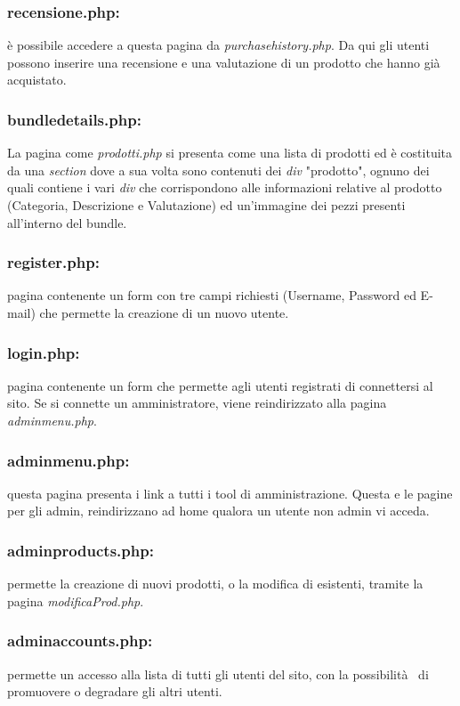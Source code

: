 \subsubsection{recensione.php:} \Spazio è possibile accedere a questa pagina da \textit{purchasehistory.php}. Da qui gli utenti possono inserire una recensione e una valutazione di un prodotto che hanno già acquistato.

\subsubsection{bundledetails.php:} \Spazio 
La pagina come \emph{prodotti.php} si presenta come una lista di prodotti ed è costituita da una \emph{section} dove a sua volta sono contenuti dei \emph{div} "prodotto", ognuno dei quali contiene i vari \emph{div} che corrispondono alle informazioni relative al prodotto (Categoria, Descrizione e Valutazione) ed un'immagine dei pezzi presenti all'interno del bundle.

\subsubsection{register.php:} \Spazio pagina contenente un form con tre campi richiesti (Username, Password ed E-mail) che permette la creazione di un nuovo utente.

\subsubsection{login.php:} \Spazio pagina contenente un form che permette agli utenti registrati di connettersi al sito. Se si connette un amministratore, viene reindirizzato alla pagina \textit{adminmenu.php}.

\subsubsection{adminmenu.php:} \Spazio questa pagina presenta i link a tutti i tool di amministrazione. Questa e le pagine per gli admin, reindirizzano ad home qualora un utente non admin vi acceda.

\subsubsection{adminproducts.php:} \Spazio permette la creazione di nuovi prodotti, o la modifica di esistenti, tramite la pagina \textit{modificaProd.php}.

\subsubsection{adminaccounts.php:} \Spazio permette un accesso alla lista di tutti gli utenti del sito, con la possibilità  di promuovere o degradare gli altri utenti.

